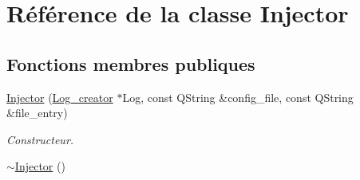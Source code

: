 \hypertarget{classInjector}{
\section{Référence de la classe Injector}
\label{classInjector}
}
\subsection*{Fonctions membres publiques}
\begin{DoxyCompactItemize}
\item 
\hyperlink{classInjector_a2db6aa9ac9175351799a7ed19a33b9e5}{Injector} (\hyperlink{classLog__creator}{Log\_\-creator} $\ast$Log, const QString \&config\_\-file, const QString \&file\_\-entry)
\begin{DoxyCompactList}\small\item\em Constructeur. \item\end{DoxyCompactList}\item 
\hypertarget{classInjector_a904aaf462f9ebb0462418aa96d5f09fa}{
\hyperlink{classInjector_a904aaf462f9ebb0462418aa96d5f09fa}{$\sim$Injector} ()}
\label{classInjector_a904aaf462f9ebb0462418aa96d5f09fa}


\end{DoxyCompactItemize}
